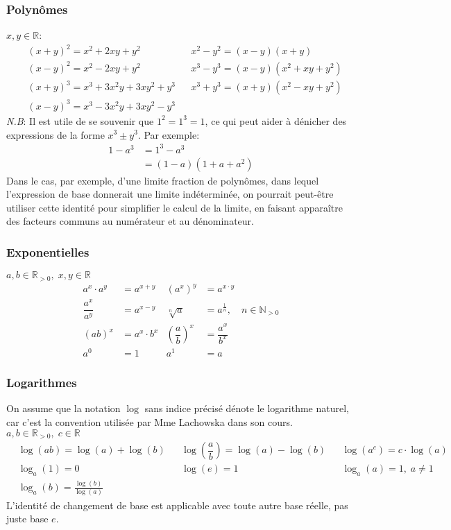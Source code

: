 \documentclass{article}
\begin{document}
\subsubsection{Polynômes} 
\(x,y \in \mathbb{R}\):
\begin{align*}
	&(x+y)^2 = x^2 + 2xy + y^2 				& 	&x^2 - y^2 = (x - y)(x + y) \\
	&(x-y)^2 = x^2 - 2xy + y^2 					& 	&x^3 - y^3 = (x - y)(x^2 + xy + y^2) \\
	&(x+y)^3 = x^3 + 3x^2y + 3xy^2 + y^3 	& 	&x^3 + y^3 = (x + y)(x^2 - xy + y^2) \\
	&(x-y)^3 = x^3 - 3x^2y + 3xy^2 - y^3 
\end{align*}
\emph{N.B}: Il est utile de se souvenir que \(1^2 = 1^3 = 1\), ce qui peut aider à dénicher des expressions de la forme \(x^3 \pm y^3\). Par exemple:
\vspace{-0.2cm}
\begin{align*}
	1 - a^3 	&= 1^3 - a^3 \\
				&= (1-a)(1+a+a^2)
\end{align*}
Dans le cas, par exemple, d'une limite fraction de polynômes, dans lequel l'expression de base donnerait une limite indéterminée, on pourrait peut-être utiliser cette identité pour simplifier le calcul de la limite, en faisant apparaître des facteurs communs au numérateur et au dénominateur.

\subsubsection{Exponentielles}
\(a, b \in \mathbb{R}_{>0}, \; x, y \in \mathbb{R}\)
\begin{align*}
	a^x \cdot a^y 		&= a^{x+y} 			&	(a^x)^y 							&= a^{x \cdot y} \\
	\dfrac{a^x}{a^y} 	&= a^{x-y}  			&	\sqrt[n]{a}						&= a^{\frac{1}{n}}, \quad n \in \mathbb{N}_{>0} \\
	(ab)^x 				&= a^x \cdot b^x 	&	\left (\dfrac{a}{b} \right )^x 	&= \dfrac{a^x}{b^x} \\
	a^0 					&= 1 					& 	a^1 								&= a
\end{align*}

\subsubsection{Logarithmes}
On assume que la notation \(\log\) sans indice précisé dénote le logarithme naturel, car c'est la convention utilisée par Mme Lachowska dans son cours. \\
\(a, b \in \mathbb{R}_{>0}, \; c \in \mathbb{R}\)
\begin{align*}
	&\log(ab) = \log(a) + \log(b) 
		& &\log{\left (\dfrac{a}{b}\right )} = \log (a) - \log (b) 
			& &\log(a^c) = c \cdot \log(a) \\
	&\log_a(1) = 0 
		& &\log(e) = 1 
			& &\log_a(a)	= 1, \; a \neq 1 \\
	&\log_a(b) = \frac{\log(b)}{\log(a)}
\end{align*}
L'identité de changement de base est applicable avec toute autre base réelle, pas juste base \(e\).
\end{document}
